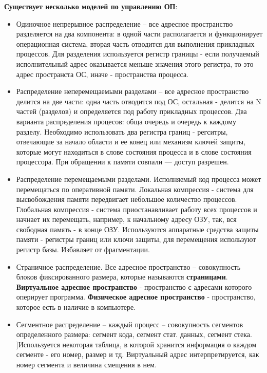 \textbf{Существует несколько моделей по управлению ОП}:
\begin{itemize}
    \item Одиночное непрерывное распределение -- все адресное пространство разделяется на два компонента: в одной части располагается и функционирует операционная система, вторая часть отводится для выполнения прикладных процессов. Для разделения используется регистр границы - если получаемый исполнительный адрес оказывается меньше значения этого регистра, то это адрес пространста ОС, иначе - пространства процесса. 
    \item Распределение неперемещаемыми разделами -- все адресное пространство делится на две части: одна часть отводится под ОС, остальная - делится на N частей (разделов) и определяется под работу прикладных процессов. Два варианта распределения процесов: обща очередь и очередь к каждому разделу. Необходимо использовать два регистра границ - регситры, отвечающие за начало области и ее конец или механизм ключей защиты, которые могут находиться в слове состояния процесса и в слове состояния процессора. При обращении к памяти совпали — доступ разрешен.
    \item Распределение перемещаемыми разделами. Исполняемый код процесса может перемещаться по оперативной памяти. Локальная компрессия - система для высвобождения памяти передвигает небольшое количество процессов. Глобальная компрессия - система приостанавливает работу всех процессов и начнает их перемещать, например,  к начальному адресу ОЗУ, так, вся свободная память - в конце ОЗУ. Используются аппаратные средства защиты памяти - регистры границ или ключи защиты, для перемещения используют регистр базы. Избавляет от фрагментации. 
    \item Страничное распределение. Все адресное пространство -- совокупность блоков фиксированного размера, которые называются \textbf{страницами}. \textbf{Виртуальное адресное пространство} - пространство с адресами которого оперирует программа. \textbf{Физическое адресное пространство} - пространство, которое есть в наличие в компьютере. 
    \item Сегментное распределение -- каждый процесс -- совокупность сегментов определенного размера: сегмент кода, сегмент стат. данных, сегмент стека. ]Используется некоторая таблица, в которой хранится информация о каждом сегменте - его номер, размер и тд. Виртуальный адрес интерпретируется, как номер сегмента и величина смещения в нем. 
\end{itemize}

